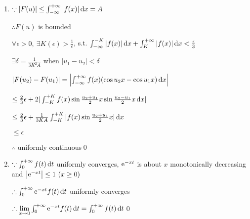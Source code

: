 \begin{enumerate}[1]
\begin{enumerate}[(1)]
    \end{enumerate}
    
    
    \item 
    $\because |F(u)|\leq\int_{-\infty}^{+\infty}|f(x)|\dif x = A$
    \par $\therefore F(u)$ is bounded
    \par $\forall \epsilon>0,\ \exists K(\epsilon)>\frac{1}{\epsilon}$, s.t. $\int_{-\infty}^{-K}|f(x)|\dif x+\int_{K}^{+\infty}|f(x)|\dif x<\frac{\epsilon}{3}$
    \par $\exists \delta = \frac{1}{3K^2A}$ when $|u_1-u_2|<\delta$
    \par $|F(u_2)-F(u_1)|=\left|\int_{-\infty}^{+\infty}f(x)(\cos{u_2x}-\cos{u_1x})\dif x\right|$
    \par $\leq \frac{2}{3}\epsilon+2|\int_{-K}^{+K}f(x)\sin \frac{u_2+u_1}{2}x \sin \frac{u_2-u_1}{2}x\dif x|$
    \par $\leq \frac{2}{3}\epsilon +  \frac{1}{3KA}\int_{-K}^{+K}|f(x)\sin \frac{u_2+u_1}{2}x |\dif x$
    \par $\leq \epsilon$
    \par $\therefore $ uniformly continuous\qed
    
    \item 
    $\because \int_0^{+\infty}f(t)\dif t $ uniformly converges,  $\mathrm{e}^{-xt} $ is about $x$ monotonically decreasing and $\left|\mathrm{e}^{-xt}\right|\leq 1\ (x\geq 0)$
    \par $\therefore \int_0^{+\infty}\me^{-xt} f(t)\dif t$ uniformly converges
    \par $\therefore \lim \limits_{x\to 0} \int_0^{+\infty}\me^{-xt} f(t)\dif t = \int_0^{+\infty} f(t)\dif t $\qed
\end{enumerate}
